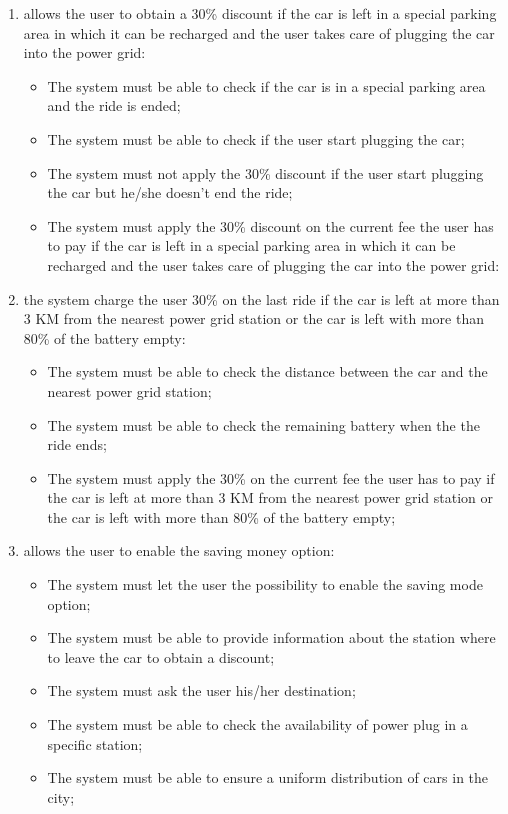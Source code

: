 \begin{enumerate}
\item allows the user to obtain a 30\% discount if the car is left in a special parking area in which it can be recharged and the user takes care of plugging the car into the power grid:

\begin{itemize}
\item The system must be able to check if the car is in a special parking area and the ride is ended;
\item The system must be able to check if the user start plugging the car;
\item The system must not apply the 30\% discount if the user start plugging the car but he/she doesn't end the ride;
\item The system must apply the 30\% discount on the current fee the user has to pay if the car is left in a special parking area in which it can be recharged and the user takes care of plugging the car into the power grid:
\end{itemize}

\item the system charge the user 30\% on the last ride if the car is left at more than 3 KM from the nearest power grid station or the car is left with more than 80\% of the battery empty:

\begin{itemize}
\item The system must be able to check the distance between the car and the nearest power grid station;
\item The system must be able to check the remaining battery when the the ride ends;
\item The system must apply the 30\% on the current fee the user has to pay if the car is left at more than 3 KM from the nearest power grid station or the car is left with more than 80\% of the battery empty;
\end{itemize}

\item allows the user to enable the saving money option:

\begin{itemize}
\item The system must let the user the possibility to enable the saving mode option;
\item The system must be able to provide information about the station where to leave the car to obtain a discount;
\item The system must ask the user his/her destination;
\item The system must be able to check the availability of power plug in a specific station;
\item The system must be able to ensure a uniform distribution of cars in the city;
\end{itemize}
\end{enumerate}
